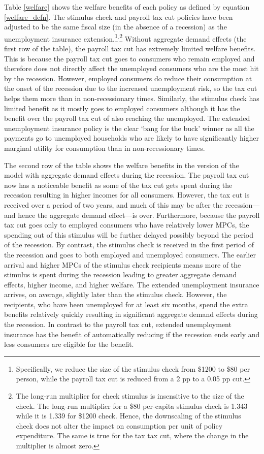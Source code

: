 \documentclass[../HAFiscal]{subfiles}
\begin{document}
Table \ref{welfare} shows the welfare benefits of each policy as defined by equation \eqref{welfare_defn}. The stimulus check and payroll tax cut policies have been adjusted to be the same fiscal size (in the absence of a recession) as the unemployment insurance extension.\footnote{Specifically, we reduce the size of the stimulus check from \$1200 to \$80 per person, while the payroll tax cut is reduced from a 2 pp to a 0.05 pp cut.}$^.$\footnote{The long-run multiplier for check stimulus is insensitive to the size of the check. The long-run multiplier for a \$80 per-capita stimulus check is 1.343 while it is 1.339 for \$1200 check. Hence, the downscaling of the stimulus check does not alter the impact on consumption per unit of policy expenditure. The same is true for the tax tax cut, where the change in the multiplier is almost zero.} Without aggregate demand effects (the first row of the table), the payroll tax cut has extremely limited welfare benefits. This is because the payroll tax cut goes to consumers who remain employed and therefore does not directly affect the unemployed consumers who are the most hit by the recession. However, employed consumers do reduce their consumption at the onset of the recession due to the increased unemployment risk, so the tax cut helps them more than in non-recessionary times.  Similarly, the stimulus check has limited benefit as it mostly goes to employed consumers although it has the benefit over the payroll tax cut of also reaching the unemployed. The extended unemployment insurance policy is the clear `bang for the buck' winner as all the payments go to unemployed households who are likely to have significantly higher marginal utility for consumption than in non-recessionary times.

The second row of the table shows the welfare benefits in the version of the model with aggregate demand effects during the recession. The payroll tax cut now has a noticeable benefit as some of the tax cut gets spent during the recession resulting in higher incomes for all consumers. However, the tax cut is received over a period of two years, and much of this may be after the recession---and hence the aggregate demand effect---is over. Furthermore, because the payroll tax cut goes only to employed consumers who have relatively lower MPCs, the spending out of this stimulus will be further delayed possibly beyond the period of the recession. By contrast, the stimulus check is received in the first period of the recession and goes to both employed and unemployed consumers. The earlier arrival and higher MPCs of the stimulus check recipients means more of the stimulus is spent during the recession leading to greater aggregate demand effects, higher income, and higher welfare. The extended unemployment insurance arrives, on average, slightly later than the stimulus check. However, the recipients, who have been unemployed for at least six months, spend the extra benefits relatively quickly resulting in significant aggregate demand effects during the recession. In contrast to the payroll tax cut, extended unemployment insurance has the benefit of automatically reducing if the recession ends early and less consumers are eligible for the benefit.
\end{document}
